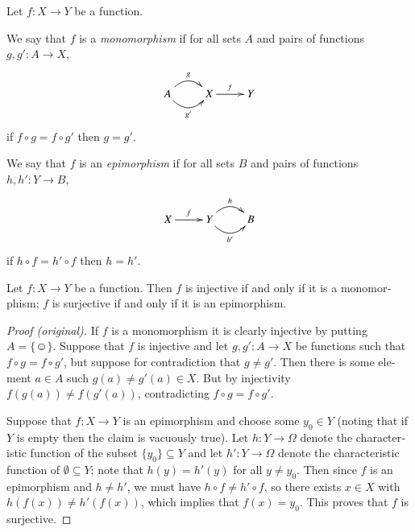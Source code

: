 \documentclass{book}
\def\singleton{\{\smiley\}}
\def\to{\rightarrow}
\def\taking{\colon}
\def\ss{\subseteq}
\theoremstyle{theoremENG}
\theoremstyle{lemmaENG}
\theoremstyle{propositionENG}
\newtheorem{propositionENG}[subsubsection]{\begin{english}Proposition\end{english}}
\theoremstyle{corollaryENG}
\theoremstyle{factENG}
\theoremstyle{remarkENG}
\theoremstyle{exampleENG}
\theoremstyle{warningENG}
\theoremstyle{questionENG}
\theoremstyle{guessENG}
\theoremstyle{answerENG}
\theoremstyle{constructionENG}
\theoremstyle{rulesENG}
\theoremstyle{excENG}
\theoremstyle{appENG}
\theoremstyle{definitionENG}
\newtheorem{definitionENG}[subsubsection]{\begin{english}Definition\end{english}}
\theoremstyle{notationENG}
\theoremstyle{conjectureENG}
\theoremstyle{postulateENG}
\newenvironment{proofENG}{\begin{proof}[Proof (original)]}{\end{proof}}
\theoremstyle{theoremRUS}
\theoremstyle{lemmaRUS}
\theoremstyle{propositionRUS}
\theoremstyle{corollaryRUS}
\theoremstyle{factRUS}
\theoremstyle{remarkRUS}
\theoremstyle{exampleRUS}
\theoremstyle{warningRUS}
\theoremstyle{questionRUS}
\theoremstyle{guessRUS}
\theoremstyle{answerRUS}
\theoremstyle{constructionRUS}
\theoremstyle{rulesRUS}
\theoremstyle{excRUS}
\theoremstyle{appRUS}
\theoremstyle{definitionRUS}
\theoremstyle{notationRUS}
\theoremstyle{conjectureRUS}
\theoremstyle{postulateRUS}
\begin{document}
\begin{english}
\begin{definitionENG}
Let $f\taking X\to Y$ be a function. 

\begin{russian} \end{russian}

We say that $f$ is a {\em monomorphism} if for all sets $A$ and pairs of functions $g,g'\taking A\to X$,
$$
\xymatrix{A\ar@/^1pc/[r]^g\ar@/_1pc/[r]_{g'}&X\ar[r]^f&Y}
$$
if $f\circ g=f\circ g'$ then $g=g'$.

\begin{russian} \end{russian}

We say that $f$ is an {\em epimorphism} if for all sets $B$ and pairs of functions $h,h'\taking Y\to B$, 
$$
\xymatrix{X\ar[r]^f&Y\ar@/^1pc/[r]^h\ar@/_1pc/[r]_{h'}&B}
$$
if $h\circ f=h'\circ f$ then $h=h'$.

\begin{russian} \end{russian}

\end{definitionENG}

\begin{propositionENG}\label{prop:inj and surj}

Let $f\taking X\to Y$ be a function. Then $f$ is injective if and only if it is a monomorphism; $f$ is surjective if and only if it is an epimorphism.

\begin{russian} \end{russian}

\end{propositionENG}

\begin{proofENG}

If $f$ is a monomorphism it is clearly injective by putting $A=\singleton$. Suppose that $f$ is injective and let $g,g'\taking A\to X$ be functions such that $f\circ g=f\circ g'$, but suppose for contradiction that $g\neq g'$. Then there is some element $a\in A$ such $g(a)\neq g'(a)\in X$. But by injectivity $f(g(a))\neq f(g'(a))$, contradicting $f\circ g=f\circ g'$.

\begin{russian} \end{russian}

Suppose that $f\taking X\to Y$ is an epimorphism and choose some $y_0\in Y$ (noting that if $Y$ is empty then the claim is vacuously true). Let $h\taking Y\to\Omega$ denote the characteristic function of the subset $\{y_0\}\ss Y$ and let $h'\taking Y\to\Omega$ denote the characteristic function of $\emptyset\ss Y$; note that $h(y)=h'(y)$ for all $y\neq y_0$. Then since $f$ is an epimorphism and $h\neq h'$, we must have $h\circ f\neq h'\circ f$, so there exists $x\in X$ with $h(f(x))\neq h'(f(x))$, which implies that $f(x)=y_0$. This proves that $f$ is surjective.


\end{proofENG}
\end{english}
\end{document}
